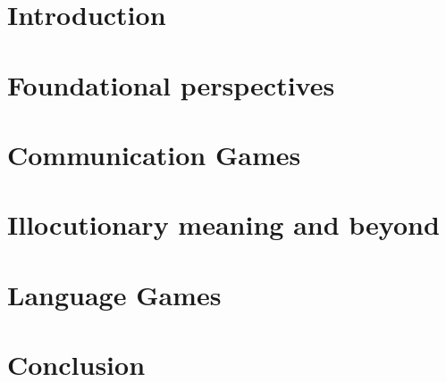 \documentclass[output=book,
        nonflat,
        modfonts,
        leqno,
        arseneau,
        oldstylenumbers,
		  ]{langsci/langscibook}
\begin{document}
\maketitle

\frontmatter 


{\sloppy\tableofcontents}
% 

%  
\mainmatter     
 

\part{Introduction}\label{part:I}



\part{Foundational perspectives}\label{part:II}


\part{Communication Games}\label{part:III}






\part{Illocutionary meaning and beyond}\label{part:IV}









\part{Language Games}\label{part:V}




\part{Conclusion}\label{part:VI}


\appendix




%  
 
\end{document}
